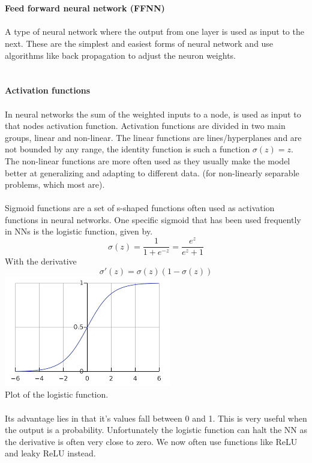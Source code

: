 \documentclass[12pt, letterpaper, twoside]{article}
\begin{document}
\ \\
\ \\
\textbf{Feed forward neural network (FFNN)}\\ 
\ \\
A type of neural network where the output from one layer is used as input to the next. These are the simplest and easiest forms of neural network and use algorithms like back propagation to adjust the neuron weights.\\
\ \\
\ \\
\textbf{Activation functions}\\
\ \\
In neural networks the sum of the weighted inputs to a node, is used as input to that nodes activation function. Activation functions are divided in two main groups, linear and non-linear. The linear functions are lines/hyperplanes and are not bounded by any range, the identity function is such a function $\sigma(z) = z$.\\
The non-linear functions are more often used as they usually make the model better at generalizing and adapting to different data. (for non-linearly separable problems, which most are).\\
\ \\
Sigmoid functions are a set of s-shaped functions often used as activation functions in neural networks. One specific sigmoid that has been used frequently in NNs is the logistic function, given by.
$$
\sigma(z) = \frac{1}{1 + e^{-z}} = \frac{e^z}{e^z + 1}
$$
With the derivative
$$
\sigma'(z) = \sigma(z)(1 - \sigma(z))
$$
\includegraphics[scale=1]{"log_func"}\\
Plot of the logistic function.\\
\ \\
Its advantage lies in that it's values fall between 0 and 1. This is very useful when the output is a probability. Unfortunately the logistic function can halt the NN as the derivative is often very close to zero. We now often use functions like ReLU and leaky ReLU instead.\\
\end{document}
